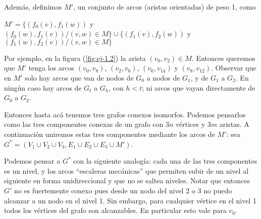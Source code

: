 Además, definimos $M'$, un conjunto de arcos (aristas orientadas) de peso 1, como 

{\footnotesize$M'= \{(f_0(v), f_1(w))$ y $(f_0(w), f_1(v)) / (v,w)\in M\} \cup \{(f_1(v), f_2(w)) $ y $(f_1(w), f_2(v))/ (v,w)\in M\}$}

Por ejemplo, en la figura (\ref{fig:ej-1.2}) la arista $(v_0, v_2)\in M$. Entonces queremos que $M'$ tenga los arcos $(v_0, v_8)$, $(v_2, v_6)$, $(v_6, v_{14})$ y $(v_8, v_{12})$.
Observar que en $M'$ solo hay arcos que van de nodos de $G_0$ a nodos de $G_1$, y de $G_1$ a $G_2$. En ningún caso hay arcos de $G_t$ a $G_h$, con $h<t$; ni arcos que vayan directamente de $G_0$ a $G_2$.

Entonces hasta acá tenemos tres grafos conexos isomorfos. Podemos pensarlos como las tres componentes conexas de un grafo con $3n$ vértices y $3m$ aristas. A continuación uniremos estas tres componentes mediante los arcos de $M'$: sea $G^*=(V_1\cup V_2\cup V_3, E_1\cup E_2\cup E_3 \cup M')$. 

Podemos pensar a $G^*$ con la siguiente analogía: cada una de las tres componentes es un nivel, y los arcos ``escaleras mecánicas'' que permiten subir de un nivel al siguiente en forma unidireccional y que no se saltea niveles. Notar que entonces $G'$ no es fuertemente conexo pues desde un nodo del nivel 2 o 3 no puedo alcanzar a un nodo en el nivel 1. Sin embargo, para cualquier vértice en el nivel 1 todos los vértices del grafo son alcanzables. En particular esto vale para $v_0$.  

\pgfmathsetmacro{}
\pgfmathsetmacro{}
\pgfmathsinandcos\sint\cost{\angFuite}

